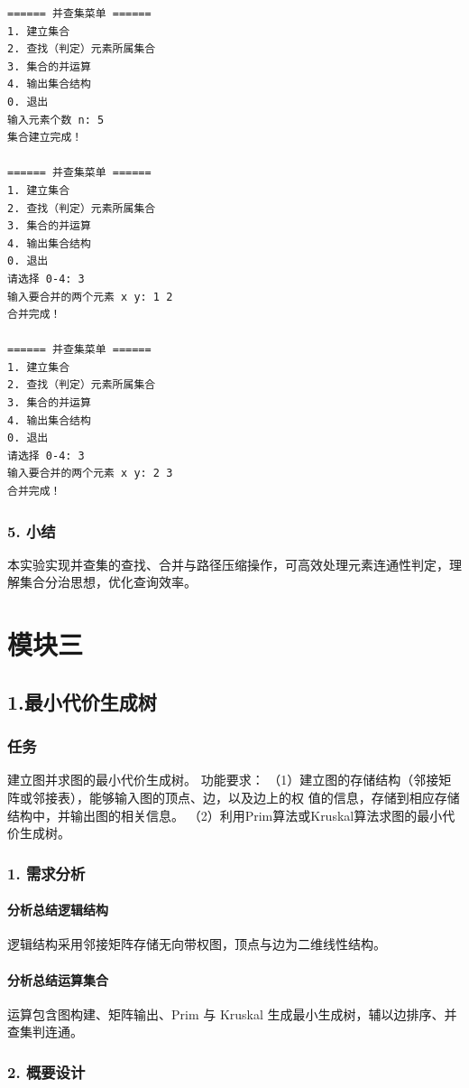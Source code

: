 \documentclass{ctexart}
\begin{document}
\begin{verbatim}
====== 并查集菜单 ======
1. 建立集合
2. 查找（判定）元素所属集合
3. 集合的并运算
4. 输出集合结构
0. 退出
输入元素个数 n: 5
集合建立完成！

====== 并查集菜单 ======
1. 建立集合
2. 查找（判定）元素所属集合
3. 集合的并运算
4. 输出集合结构
0. 退出
请选择 0-4: 3
输入要合并的两个元素 x y: 1 2
合并完成！

====== 并查集菜单 ======
1. 建立集合
2. 查找（判定）元素所属集合
3. 集合的并运算
4. 输出集合结构
0. 退出
请选择 0-4: 3
输入要合并的两个元素 x y: 2 3
合并完成！
\end{verbatim}

\subsubsection{5. 小结}
本实验实现并查集的查找、合并与路径压缩操作，可高效处理元素连通性判定，理解集合分治思想，优化查询效率。

\section{模块三}


\subsection {1.最小代价生成树}
\subsubsection {任务}
建立图并求图的最小代价生成树。 功能要求： （1）建立图的存储结构（邻接矩阵或邻接表），能够输入图的顶点、边，以及边上的权 值的信息，存储到相应存储结构中，并输出图的相关信息。 （2）利用Prim算法或Kruskal算法求图的最小代价生成树。
\subsubsection{1. 需求分析}
\paragraph{分析总结逻辑结构}
逻辑结构采用邻接矩阵存储无向带权图，顶点与边为二维线性结构。
\paragraph{分析总结运算集合}
运算包含图构建、矩阵输出、Prim 与 Kruskal 生成最小生成树，辅以边排序、并查集判连通。
\subsubsection{2. 概要设计}
\end{document}
